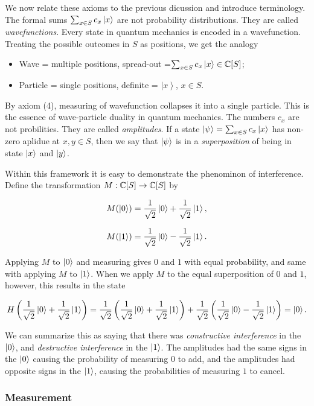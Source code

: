 We now relate these axioms to the previous dicussion and introduce terminology. The formal sums $\sum_{x\in S}c_x\ket{x}$ are not probability distributions. They are called \textit{wavefunctions}. Every state in quantum mechanics is encoded in a wavefunction. Treating the possible outcomes in $S$ as positions, we get the analogy

\begin{itemize}
\item Wave = multiple positions, spread-out =$\sum_{x\in S}c_x\ket{x}\in \mathbb{C}[S]$;
\item Particle = single positions, definite = $\left|x\right>$, $x\in S$.
\end{itemize}

By axiom (4), measuring of wavefunction collapses it into a single particle. This is the essence of wave-particle duality in quantum mechanics. The numbers $c_x$ are not probilities. They are called \textit{amplitudes}. If a state $\ket{\psi}=\sum_{x\in S}c_x \ket{x}$ has non-zero aplidue at $x,y\in S$, then we say that $\ket{\psi}$ is in a \textit{superposition} of being in state $\ket{x}$ and $\ket{y}$.

Within this framework it is easy to demonstrate the phenominon of interference. Define the transformation $M: \mathbb{C}[S]\to \mathbb{C}[S]$ by

$$M(\left|0\right>)=\frac{1}{\sqrt{2}}\left|0\right>+\frac{1}{\sqrt{2}}\left|1\right>,$$

$$M(\left|1\right>)=\frac{1}{\sqrt{2}}\left|0\right>-\frac{1}{\sqrt{2}}\left|1\right>.$$

Applying $M$ to $\left|0\right>$ and measuring gives $0$ and $1$ with equal probability, and same with applying $M$ to $\left|1\right>$. When we apply $M$ to the equal superposition of $0$ and $1$, however, this results in the state

$$H\left(\frac{1}{\sqrt{2}}\left|0\right>+\frac{1}{\sqrt{2}}\left|1\right>\right)=\frac{1}{\sqrt{2}}\left(\frac{1}{\sqrt{2}}\left|0\right>+\frac{1}{\sqrt{2}}\left|1\right>\right)+\frac{1}{\sqrt{2}}\left(\frac{1}{\sqrt{2}}\left|0\right>-\frac{1}{\sqrt{2}}\left|1\right>\right)=\left|0\right>.$$

We can summarize this as saying that there was \textit{constructive interference} in the $\left|0\right>$, and \textit{destructive interference} in the $\left|1\right>$. The amplitudes had the same signs in the $\left|0\right>$ causing the probability of measuring $0$ to add, and the amplitudes had opposite signs in the $\left|1\right>$, causing the probabilities of measuring $1$ to cancel. 

\subsubsection{Measurement}

